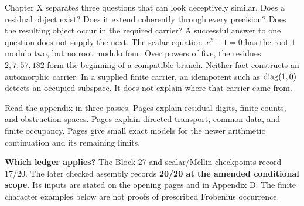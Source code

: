Chapter X separates three questions that can look deceptively similar. Does a residual object exist? Does it extend coherently through every precision? Does the resulting object occur in the required carrier? A successful answer to one question does not supply the next.
The scalar equation $x^2+1=0$ has the root $1$ modulo two, but no root modulo four. Over powers of five, the residues $2,7,57,182$ form the beginning of a compatible branch. Neither fact constructs an automorphic carrier. In a supplied finite carrier, an idempotent such as $\operatorname{diag}(1,0)$ detects an occupied subspace. It does not explain where that carrier came from.

Read the appendix in three passes. Pages  explain residual digits, finite counts, and obstruction spaces. Pages  explain directed transport, common data, and finite occupancy. Pages  give small exact models for the newer arithmetic continuation and its remaining limits.
\begin{insight}
\textbf{Which ledger applies?} The Block 27 and scalar/Mellin checkpoints record 17/20. The later checked assembly records \textbf{20/20 at the amended conditional scope}. Its inputs are stated on the opening pages and in Appendix D. The finite character examples below are not proofs of prescribed Frobenius occurrence.
\end{insight}

